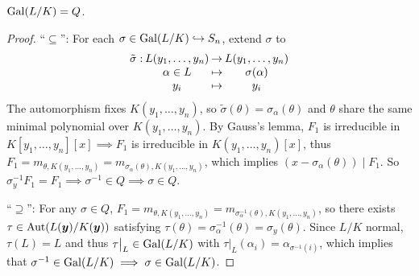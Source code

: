 \begin{prop}
  $\operatorname{Gal}(L/K) = Q$.

  \begin{proof}
    ``$\subseteq$'': For each $\sigma \in \operatorname{Gal}(L/K) \hookrightarrow S_n$, extend $\sigma$ to
    \[
      \arraycolsep=1pt
      \begin{array}{rccc}
        \tilde\sigma: & L(y_1, \dots, y_n) & \to & L(y_1, \dots, y_n) \\
        & \alpha \in L & \mapsto & \sigma(\alpha) \\
        & y_i & \mapsto & y_i
      \end{array}
    \]
    The automorphism fixes $K(y_1, \dots, y_n)$, so
    $\tilde\sigma(\theta) = \sigma_\alpha(\theta)$ and $\theta$ share the
    same minimal polynomial over $K(y_1, \dots, y_n)$.
    By Gauss's lemma, $F_1$ is irreducible in $K[y_1, \dots, y_n][x] \implies F_1$
    is irreducible in $K(y_1, \dots, y_n)[x]$, thus
    $F_1 = m_{\theta, K(y_1, \dots, y_n)}
    = m_{\sigma_\alpha(\theta), K(y_1, \dots, y_n)}$, which implies
    $(x - \sigma_\alpha(\theta)) \mid F_1$.
    So $\sigma_y^{-1} F_1 = F_1 \implies \sigma^{-1} \in Q \implies \sigma \in Q$.

    ``$\supseteq$'': For any $\sigma \in Q$, $F_1 = m_{\theta, K(y_1, \dots, y_n)}
    = m_{\sigma^{-1}_\alpha(\theta), K(y_1, \dots, y_n)}$, so there exists
    $\tau \in \operatorname{Aut}(L(\bm{y}) / K(\bm{y}))$ satisfying
    $\tau(\theta) = \sigma_\alpha^{-1}(\theta) = \sigma_y(\theta)$.
    Since $L/K$ normal, $\tau(L) = L$ and thus $\tau\big|_L \in \operatorname{Gal}(L/K)$ with
    $\tau\big|_L(\alpha_i) = \alpha_{\sigma^{-1}(i)}$, which implies that
    $\sigma^{-1} \in \operatorname{Gal}(L/K) \implies \sigma \in \operatorname{Gal}(L/K)$.
  \end{proof}
\end{prop}

